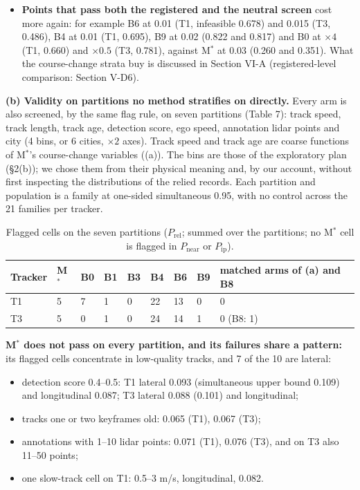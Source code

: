 \documentclass{ieeeaccess}
\begin{document}
\begin{itemize}
\item \textbf{Points that pass both the registered and the neutral screen} cost more again: for example B6 at 0.01 (T1, infeasible 0.678) and 0.015 (T3, 0.486), B4 at 0.01 (T1, 0.695), B9 at 0.02 (0.822 and 0.817) and B0 at $\times4$ (T1, 0.660) and $\times0.5$ (T3, 0.781), against M$^{*}$ at 0.03 (0.260 and 0.351). What the course-change strata buy is discussed in Section VI-A (registered-level comparison: Section V-D6).
\end{itemize}

\textbf{(b) Validity on partitions no method stratifies on directly.} Every arm is also screened, by the same flag rule, on seven partitions (Table 7): track speed, track length, track age, detection score, ego speed, annotation lidar points and city (4 bins, or 6 cities, $\times 2$ axes). Track speed and track age are coarse functions of M$^{*}$'s course-change variables ((a)). The bins are those of the exploratory plan (\S{}2(b)); we chose them from their physical meaning and, by our account, without first inspecting the distributions of the relied records. Each partition and population is a family at one-sided simultaneous 0.95, with no control across the 21 families per tracker.

\begin{table}[!t]
\centering
\caption{Flagged cells on the seven partitions ($P_{\mathrm{rel}}$; summed over the partitions; no M$^{*}$ cell is flagged in $P_{\mathrm{near}}$ or $P_{\mathrm{ip}}$).}
\label{tab:7}
\footnotesize
\setlength{\tabcolsep}{3pt}
\renewcommand{\arraystretch}{1.15}
\begin{tabular}{@{}L{0.173\columnwidth}L{0.064\columnwidth}L{0.064\columnwidth}L{0.064\columnwidth}L{0.064\columnwidth}L{0.064\columnwidth}L{0.064\columnwidth}L{0.064\columnwidth}L{0.175\columnwidth}@{}}
\hline
Tracker & M$^{*}$ & B0 & B1 & B3 & B4 & B6 & B9 & matched arms of (a) and B8 \\
\hline
T1 & 5 & 7 & 1 & 0 & 22 & 13 & 0 & 0 \\
T3 & 5 & 0 & 1 & 0 & 24 & 14 & 1 & 0 (B8: 1) \\
\hline
\end{tabular}
\end{table}

\textbf{M$^{*}$ does not pass on every partition, and its failures share a pattern:} its flagged cells concentrate in low-quality tracks, and 7 of the 10 are lateral:

\begin{itemize}
\item detection score 0.4--0.5: T1 lateral 0.093 (simultaneous upper bound 0.109) and longitudinal 0.087; T3 lateral 0.088 (0.101) and longitudinal;
\item tracks one or two keyframes old: 0.065 (T1), 0.067 (T3);
\item annotations with 1--10 lidar points: 0.071 (T1), 0.076 (T3), and on T3 also 11--50 points;
\item one slow-track cell on T1: 0.5--3 m/s, longitudinal, 0.082.
\end{itemize}
\end{document}
